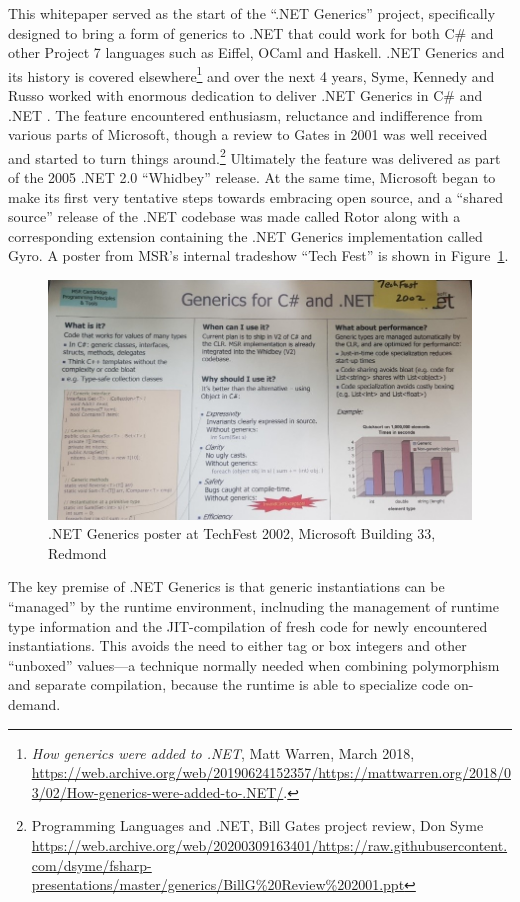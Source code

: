 \documentclass[acmsmall]{acmart}\settopmatter{}
\begin{document}
This whitepaper served as the start of the “.NET Generics” project, specifically designed to bring a form of generics to .NET that could work for both C\# and other
Project 7 languages such as Eiffel, OCaml and Haskell. .NET Generics and its history is covered elsewhere\footnote{\textit{How generics were added to .NET}, Matt
Warren, March 2018, \url{https://web.archive.org/web/20190624152357/https://mattwarren.org/2018/03/02/How-generics-were-added-to-.NET/}.} and over the next 4 years, Syme, Kennedy and Russo worked with
enormous dedication to deliver .NET Generics in C\# and .NET \citep{Kennedy2001}. The feature encountered enthusiasm, reluctance and indifference from
various parts of Microsoft, though a review to Gates in 2001 was well received and started to turn things around.\footnote{Programming Languages and  .NET, Bill Gates
project review, Don Syme \url{https://web.archive.org/web/20200309163401/https://raw.githubusercontent.com/dsyme/fsharp-presentations/master/generics/BillG\%20Review\%202001.ppt}}   Ultimately the feature was
delivered as part of the 2005 .NET 2.0 “Whidbey” release.  At the same time, Microsoft began to make its first very tentative steps towards embracing open
source, and a “shared source” release of the .NET codebase was made called Rotor along with a corresponding extension containing the .NET Generics implementation
called Gyro.  A poster from MSR’s internal tradeshow “Tech Fest” is shown in Figure~\ref{fig:fig1}. 

\begin{figure}

  \includegraphics[width=0.8\linewidth]{fig1.jpg}
  \caption{.NET Generics poster at TechFest 2002, Microsoft Building 33, Redmond}
  \label{fig:fig1}

\end{figure}

The key premise of .NET Generics is that generic instantiations can be “managed” by the runtime environment, inclnuding the management of runtime type information
and the JIT-compilation of fresh code for newly encountered instantiations.  This avoids the need to either tag or box integers and other “unboxed” values---a technique
normally needed when combining polymorphism and separate compilation, because the runtime is able to specialize code on-demand.
\end{document}
